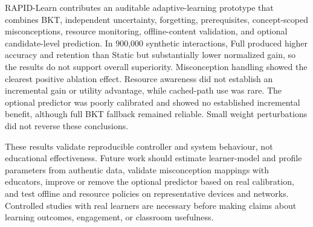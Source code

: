 \documentclass[conference]{IEEEtran}
\begin{document}
RAPID-Learn contributes an auditable adaptive-learning prototype that combines
BKT, independent uncertainty, forgetting, prerequisites, concept-scoped
misconceptions, resource monitoring, offline-content validation, and optional
candidate-level prediction. In 900,000 synthetic interactions, Full produced
higher accuracy and retention than Static but substantially lower normalized
gain, so the results do not support overall superiority. Misconception handling
showed the clearest positive ablation effect. Resource awareness did not
establish an incremental gain or utility advantage, while cached-path use was
rare. The optional predictor was poorly calibrated and showed no established
incremental benefit, although full BKT fallback remained reliable. Small
weight perturbations did not reverse these conclusions.

These results validate reproducible controller and system behaviour, not
educational effectiveness. Future work should estimate learner-model and
profile parameters from authentic data, validate misconception mappings with
educators, improve or remove the optional predictor based on real calibration,
and test offline and resource policies on representative devices and networks.
Controlled studies with real learners are necessary before making claims about
learning outcomes, engagement, or classroom usefulness.
\end{document}
